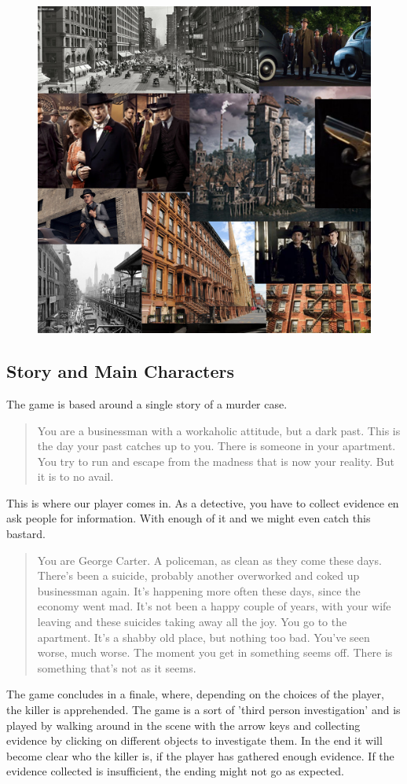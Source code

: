 \documentclass{article}
\begin{document}
		\begin{figure}[ht!]
			\centering
			\includegraphics[width=120mm]{images/Collage.png}
		\end{figure}
	\subsection{Story and Main Characters}
		The game is based around a single story of a murder case. 
		\begin{quote}
			You are a businessman with a workaholic attitude, but a dark past. This is the day your past catches up to you. There is someone in your apartment. You try to run and escape from the madness that is now your reality. But it is to no avail.
		\end{quote}
		This is where our player comes in. As a detective, you have to collect evidence en ask people for information. With enough of it and we might even catch this bastard.
		\begin{quote}
			You are George Carter. A policeman, as clean as they come these days. There’s been a suicide, probably another overworked and coked up businessman again. It’s happening more often these days, since the economy went mad. It’s not been a happy couple of years, with your wife leaving and these suicides taking away all the joy. You go to the apartment. It’s a shabby old place, but nothing too bad. You’ve seen worse, much worse. The moment you get in something seems off. There is something that’s not as it seems.
		\end{quote}
		\noindent
		The game concludes in a finale, where, depending on the choices of the player, the killer is apprehended. The game is a sort of 'third person investigation' and is played by walking around in the scene with the arrow keys and collecting evidence by clicking on different objects to investigate them. In the end it will become clear who the killer is, if the player has gathered enough evidence. If the evidence collected is insufficient, the ending might not go as expected.\\ \\
\newpage
\end{document}
